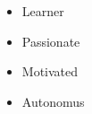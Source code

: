 %
%
%

\twocolumnsection
{
\begin{skills}
\end{skills}}
{
\vspace{1em}
\begin{itemize}
	\item Learner
	\item Passionate
	\item Motivated                    
    \item Autonomus
\end{itemize}
}
